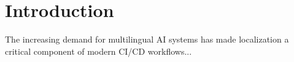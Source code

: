 \section{Introduction}
The increasing demand for multilingual AI systems has made localization a critical component of modern CI/CD workflows...